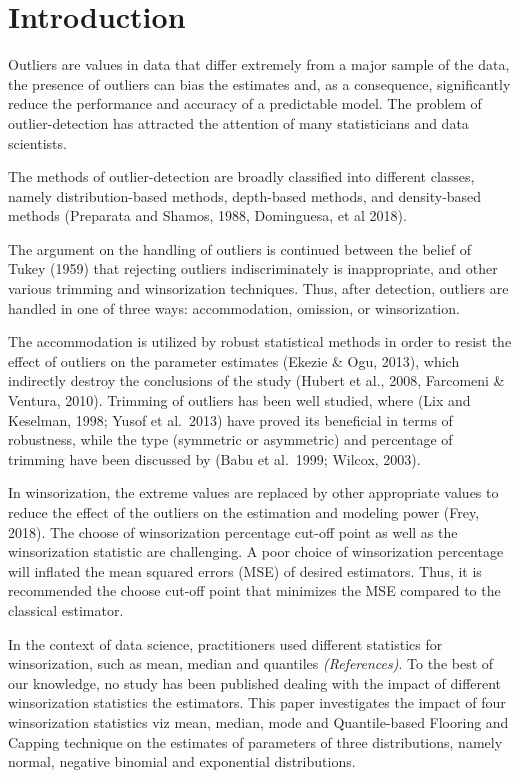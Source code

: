 \documentclass[notitlepage,12pt]{jedm}
\begin{document}
\hypertarget{introduction}{%
\section{Introduction}\label{introduction}}

Outliers are values in data that differ extremely from a major sample of
the data, the presence of outliers can bias the estimates and, as a
consequence, significantly reduce the performance and accuracy of a
predictable model. The problem of outlier-detection has attracted the
attention of many statisticians and data scientists.

The methods of outlier-detection are broadly classified into different
classes, namely distribution-based methods, depth-based methods, and
density-based methods (Preparata and Shamos, 1988, Dominguesa, et al
2018).

The argument on the handling of outliers is continued between the belief
of Tukey (1959) that rejecting outliers indiscriminately is
inappropriate, and other various trimming and winsorization techniques.
Thus, after detection, outliers are handled in one of three ways:
accommodation, omission, or winsorization.

The accommodation is utilized by robust statistical methods in order to
resist the effect of outliers on the parameter estimates (Ekezie \& Ogu,
2013), which indirectly destroy the conclusions of the study (Hubert et
al., 2008, Farcomeni \& Ventura, 2010). Trimming of outliers has been
well studied, where (Lix and Keselman, 1998; Yusof et al.~2013) have
proved its beneficial in terms of robustness, while the type (symmetric
or asymmetric) and percentage of trimming have been discussed by (Babu
et al.~1999; Wilcox, 2003).

In winsorization, the extreme values are replaced by other appropriate
values to reduce the effect of the outliers on the estimation and
modeling power (Frey, 2018). The choose of winsorization percentage
cut-off point as well as the winsorization statistic are challenging. A
poor choice of winsorization percentage will inflated the mean squared
errors (MSE) of desired estimators. Thus, it is recommended the choose
cut-off point that minimizes the MSE compared to the classical
estimator.

In the context of data science, practitioners used different statistics
for winsorization, such as mean, median and quantiles
\emph{(References)}. To the best of our knowledge, no study has been
published dealing with the impact of different winsorization statistics
the estimators. This paper investigates the impact of four winsorization
statistics viz mean, median, mode and Quantile-based Flooring and
Capping technique on the estimates of parameters of three distributions,
namely normal, negative binomial and exponential distributions.
\end{document}
